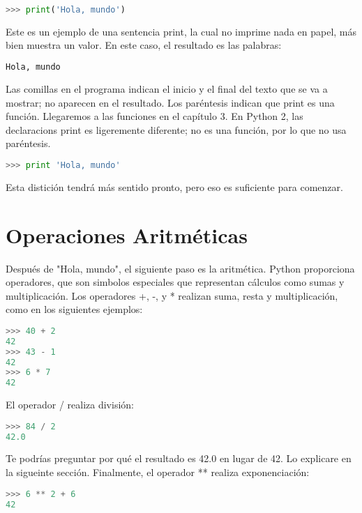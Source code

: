 \begin{lstlisting}[language=Python, basicstyle=\ttfamily]
>>> print('Hola, mundo')
\end{lstlisting}

Este es un ejemplo de una sentencia print, la cual no imprime nada en papel,
más bien muestra un valor. En este caso, el resultado es las palabras:

\begin{lstlisting}[language=Python, basicstyle=\ttfamily]
Hola, mundo
\end{lstlisting}

Las comillas en el programa indican el inicio y el final del texto que se va a mostrar;
no aparecen en el resultado. Los paréntesis indican que print es una función. Llegaremos a las funciones en el capítulo 3.
En Python 2, las declaracions print es ligeremente diferente; no es una función,
por lo que no usa paréntesis.

\begin{lstlisting}[language=Python, basicstyle=\ttfamily]
>>> print 'Hola, mundo'
\end{lstlisting}

Esta distición tendrá más sentido pronto, pero eso es suficiente para comenzar.

\section{Operaciones Aritméticas}
Después de "Hola, mundo", el siguiente paso es la aritmética. Python proporciona operadores, 
que son simbolos especiales que representan cálculos como sumas y multiplicación. 
Los operadores +, -, y * realizan suma, resta y multiplicación, 
como en los siguientes ejemplos:

\begin{lstlisting}[language=Python, basicstyle=\ttfamily]
>>> 40 + 2
42
>>> 43 - 1
42
>>> 6 * 7
42
\end{lstlisting}

El operador / realiza división:

\begin{lstlisting}[language=Python, basicstyle=\ttfamily]
>>> 84 / 2
42.0
\end{lstlisting}

Te podrías preguntar por qué el resultado es 42.0 en lugar de 42. Lo explicare en la sigueinte sección.
Finalmente, el operador ** realiza exponenciación:

\begin{lstlisting}[language=Python, basicstyle=\ttfamily]
>>> 6 ** 2 + 6
42
\end{lstlisting}

